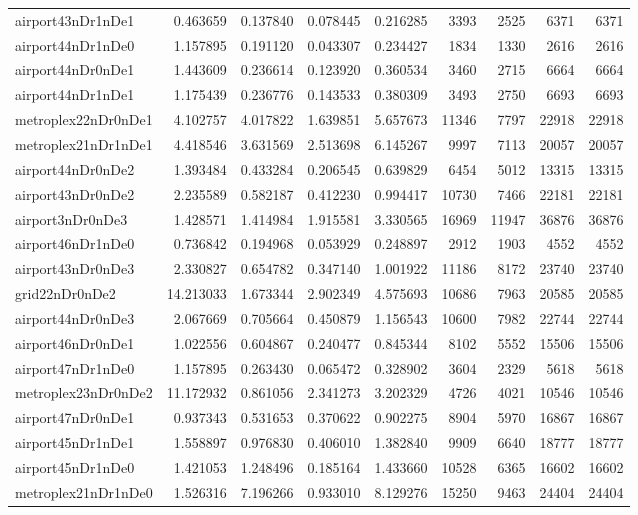 \begin{longtable}{|l|r|r|r|r|r|r|r|r|}
airport43nDr1nDe1 & 0.463659 & 0.137840 & 0.078445 & 0.216285 & 3393 & 2525 & 6371 & 6371 \\
airport44nDr1nDe0 & 1.157895 & 0.191120 & 0.043307 & 0.234427 & 1834 & 1330 & 2616 & 2616 \\
airport44nDr0nDe1 & 1.443609 & 0.236614 & 0.123920 & 0.360534 & 3460 & 2715 & 6664 & 6664 \\
airport44nDr1nDe1 & 1.175439 & 0.236776 & 0.143533 & 0.380309 & 3493 & 2750 & 6693 & 6693 \\
metroplex22nDr0nDe1 & 4.102757 & 4.017822 & 1.639851 & 5.657673 & 11346 & 7797 & 22918 & 22918 \\
metroplex21nDr1nDe1 & 4.418546 & 3.631569 & 2.513698 & 6.145267 & 9997 & 7113 & 20057 & 20057 \\
airport44nDr0nDe2 & 1.393484 & 0.433284 & 0.206545 & 0.639829 & 6454 & 5012 & 13315 & 13315 \\
airport43nDr0nDe2 & 2.235589 & 0.582187 & 0.412230 & 0.994417 & 10730 & 7466 & 22181 & 22181 \\
airport3nDr0nDe3 & 1.428571 & 1.414984 & 1.915581 & 3.330565 & 16969 & 11947 & 36876 & 36876 \\
airport46nDr1nDe0 & 0.736842 & 0.194968 & 0.053929 & 0.248897 & 2912 & 1903 & 4552 & 4552 \\
airport43nDr0nDe3 & 2.330827 & 0.654782 & 0.347140 & 1.001922 & 11186 & 8172 & 23740 & 23740 \\
grid22nDr0nDe2 & 14.213033 & 1.673344 & 2.902349 & 4.575693 & 10686 & 7963 & 20585 & 20585 \\
airport44nDr0nDe3 & 2.067669 & 0.705664 & 0.450879 & 1.156543 & 10600 & 7982 & 22744 & 22744 \\
airport46nDr0nDe1 & 1.022556 & 0.604867 & 0.240477 & 0.845344 & 8102 & 5552 & 15506 & 15506 \\
airport47nDr1nDe0 & 1.157895 & 0.263430 & 0.065472 & 0.328902 & 3604 & 2329 & 5618 & 5618 \\
metroplex23nDr0nDe2 & 11.172932 & 0.861056 & 2.341273 & 3.202329 & 4726 & 4021 & 10546 & 10546 \\
airport47nDr0nDe1 & 0.937343 & 0.531653 & 0.370622 & 0.902275 & 8904 & 5970 & 16867 & 16867 \\
airport45nDr1nDe1 & 1.558897 & 0.976830 & 0.406010 & 1.382840 & 9909 & 6640 & 18777 & 18777 \\
airport45nDr1nDe0 & 1.421053 & 1.248496 & 0.185164 & 1.433660 & 10528 & 6365 & 16602 & 16602 \\
metroplex21nDr1nDe0 & 1.526316 & 7.196266 & 0.933010 & 8.129276 & 15250 & 9463 & 24404 & 24404 \\

\end{longtable}
